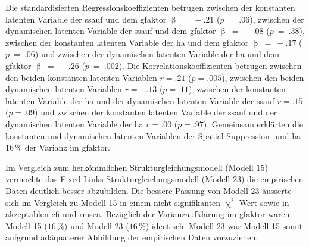\documentclass[11pt, twoside, a4paper]{book}		%
\begin{document}
Die standardisierten Regressionskoeffizienten betrugen zwischen der konstanten latenten Variable der \gls{ssauf} und dem \gls{gfaktor} $\upbeta~=~-.21$ ($p~=~.06$), zwischen der dynamischen latenten Variable der \gls{ssauf} und dem \gls{gfaktor} $\upbeta~=~-.08$ ($p~=~.38$), zwischen der konstanten latenten Variable der \gls{ha} und dem \gls{gfaktor} $\upbeta~=~-.17$ ($p~=~.06$) und zwischen der dynamischen latenten Variable der \gls{ha} und dem \gls{gfaktor} $\upbeta~=~-.26$ ($p~=~.002$). Die Korrelationskoeffizienten betrugen zwischen den beiden konstanten latenten Variablen $r=.21$ ($p=.005$), zwischen den beiden dynamischen latenten Variablen $r=-.13$ ($p=.11$), zwischen der konstanten latenten Variable der \gls{ha} und der dynamischen latenten Variable der \gls{ssauf} $r=.15$ ($p=.09$) und zwischen der konstanten latenten Variable der \gls{ssauf} und der dynamischen latenten Variable der \gls{ha} $r=.00$ ($p=.97$). Gemeinsam erklärten die konstanten und dynamischen latenten Variablen der Spatial-Suppression- und \gls{ha} $16\,\%$ der Varianz im \gls{gfaktor}. 




Im Vergleich zum herkömmlichen Strukturgleichungsmodell (Modell 15) vermochte das Fixed-Links-Strukturgleichungsmodell (Modell 23) die empirischen Daten deutlich besser abzubilden. Die bessere Passung von Modell 23 äusserte sich im Vergleich zu Modell 15 in einem nicht-signifikanten $\upchi^2$-Wert sowie in akzeptablen \gls{cfi} und \gls{rmsea}. Bezüglich der Varianzaufklärung im \gls{gfaktor} waren Modell 15 ($16\,\%$) und Modell 23 ($16\,\%$) identisch. Modell 23 war Modell 15 somit aufgrund adäquaterer Abbildung der empirischen Daten vorzuziehen.
\end{document}
